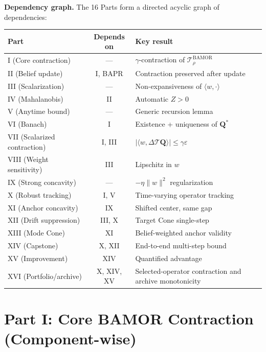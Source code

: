 \medskip
\noindent\textbf{Dependency graph.}  The 16 Parts form a directed acyclic graph of dependencies:
\begin{center}
\small
\begin{tabular}{lcl}
\toprule
\textbf{Part} & \textbf{Depends on} & \textbf{Key result} \\
\midrule
I (Core contraction) & --- & $\gamma$-contraction of $\mathcal{T}^{\mathrm{BAMOR}}_\rho$ \\
II (Belief update) & I, BAPR & Contraction preserved after update \\
III (Scalarization) & --- & Non-expansiveness of $\langle w, \cdot \rangle$ \\
IV (Mahalanobis) & II & Automatic $Z > 0$ \\
V (Anytime bound) & --- & Generic recursion lemma \\
VI (Banach) & I & Existence + uniqueness of $\mathbf{Q}^*$ \\
VII (Scalarized contraction) & I, III & $|\langle w, \Delta \mathcal{T}\mathbf{Q} \rangle| \le \gamma\varepsilon$ \\
VIII (Weight sensitivity) & III & Lipschitz in $w$ \\
IX (Strong concavity) & --- & $-\eta\|w\|^2$ regularization \\
X (Robust tracking) & I, V & Time-varying operator tracking \\
XI (Anchor concavity) & IX & Shifted center, same gap \\
XII (Drift suppression) & III, X & Target Cone single-step \\
XIII (Mode Cone) & XI & Belief-weighted anchor validity \\
XIV (Capstone) & X, XII & End-to-end multi-step bound \\
XV (Improvement) & XIV & Quantified advantage \\
XVI (Portfolio/archive) & X, XIV, XV & Selected-operator contraction and archive monotonicity \\
\bottomrule
\end{tabular}
\end{center}


\section{Part I: Core BAMOR Contraction (Component-wise)}
\label{app:contraction}

